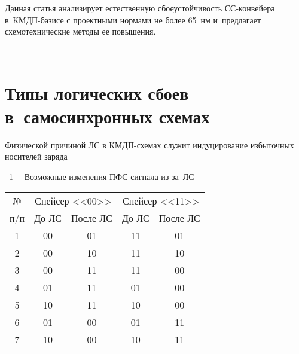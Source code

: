 \begin{multicols}{2}
Данная статья 
анализирует естественную сбоеустойчивость СС-кон\-вей\-ера в~КМДП-базисе 
с проектными нормами не более 65~нм и~предлагает схемотехнические 
методы ее повышения.

 \begin{figure*}[b] %
\vspace*{1pt}
    \begin{center}  
  \mbox{%
 \epsfxsize=122.326mm 
 }
\end{center}
\vspace*{-11pt}
\end{figure*}
   
   
   \vspace*{-4pt}
   

\section{Типы логических сбоев в~самосинхронных схемах}

      \vspace*{-4pt}

  Физической причиной ЛС в КМДП-схе\-мах служит индуцирование 
избыточных носителей заряда\linebreak\vspace*{-12pt}

\pagebreak

\begin{center}

\parbox{73mm}{{{\tablename~1}\ \ \small{
Возможные изменения ПФС сигнала из-за~ЛС
}}}


\vspace*{2ex}

{\small \begin{tabular}{|c|c|c|c|c|}
\hline
№ 
&\multicolumn{2}{c|}{Спейсер <<00>>}&\multicolumn{2}{c|}{Спейсер <<11>>}\\
\cline{2-5}
п/п&До ЛС&После ЛС&До ЛС&После ЛС\\
\hline
1&00&01&11&01\\
2&00&10&11&10\\
3&00&11&11&00\\
4&01&11&01&00\\
5&10&11&10&00\\
6&01&00&01&11\\
7&10&00&10&11\\
\hline
\end{tabular}}
\end{center}


\end{multicols}
